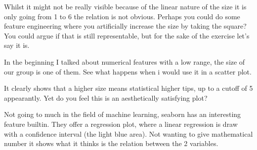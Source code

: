 \documentclass[letterpaper,10pt,english]{jupyterBook}
\begin{document}
\begin{sphinxVerbatim}[commandchars=\\\{\}]
     
\end{sphinxVerbatim}

\noindent{}

\sphinxAtStartPar
Whilst it might not be really visible because of the linear nature of the size \sphinxhyphen{} it is only going from 1 to 6 \sphinxhyphen{} the relation is not obvious.
Perhaps you could do some feature engineering where you artificially increase the size by taking the square?
You could argue if that is still representable, but for the sake of the exercise let’s say it is.

\sphinxAtStartPar
In the beginning I talked about numerical features with a low range, the size of our group is one of them.
See what happens when i would use it in a scatter plot.

\begin{sphinxVerbatim}[commandchars=\\\{\}]
    
\end{sphinxVerbatim}

\noindent{}

\sphinxAtStartPar
It clearly shows that a higher size means statistical higher tips, up to a cut\sphinxhyphen{}off of 5 appearantly.
Yet do you feel this is an aesthetically satisfying plot?

\sphinxAtStartPar
Not going to much in the field of machine learning, seaborn has an interesting feature built\sphinxhyphen{}in.
They offer a regression plot, where a linear regression is draw with a confidence interval (the light blue area).
Not wanting to give mathematical number it shows what it thinks is the relation between the 2 variables.
\end{document}
